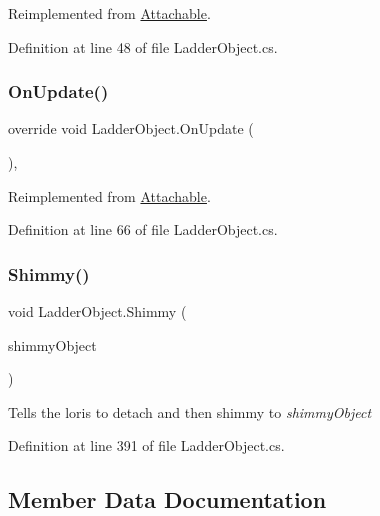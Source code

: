 Reimplemented from \mbox{\hyperlink{class_attachable_a3c05c0b07b831881a7ab245057d34d30}{Attachable}}.



Definition at line 48 of file Ladder\+Object.\+cs.

\mbox{\label{class_ladder_object_a0ea09ce266154cd7be7ddb15c7f31874}} 
\subsubsection{\texorpdfstring{On\+Update()}{OnUpdate()}}
{\footnotesize\ttfamily override void Ladder\+Object.\+On\+Update (\begin{DoxyParamCaption}{ }\end{DoxyParamCaption})\hspace{0.3cm}{\ttfamily [protected]}, {\ttfamily [virtual]}}



Reimplemented from \mbox{\hyperlink{class_attachable_abb659a66efacd6fa09fa1d7125c7b5e6}{Attachable}}.



Definition at line 66 of file Ladder\+Object.\+cs.

\mbox{\label{class_ladder_object_a08d0308b642574244b62c2281a1f03c7}} 
\subsubsection{\texorpdfstring{Shimmy()}{Shimmy()}}
{\footnotesize\ttfamily void Ladder\+Object.\+Shimmy (\begin{DoxyParamCaption}\item[{\mbox{\hyperlink{class_ladder_object}{Ladder\+Object}}}]{shimmy\+Object }\end{DoxyParamCaption})}



Tells the loris to detach and then shimmy to {\itshape shimmy\+Object}  



Definition at line 391 of file Ladder\+Object.\+cs.



\subsection{Member Data Documentation}
\mbox{\label{class_ladder_object_acef7b0cbc039eea9e32cd5e56bbc9fae}} 
